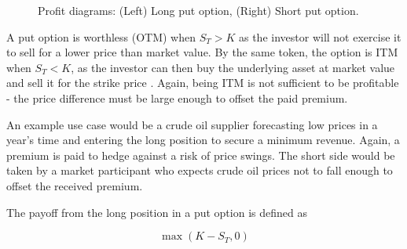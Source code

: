\documentclass[english,12pt,a4paper,pdftex,sci,utf8]{aaltothesis}
\begin{document}
\begin{figure}[H]
{

    
}
\caption{Profit diagrams: (Left) Long put option, (Right) Short put option.}
\label{fig:put_payoff}
\end{figure}

A put option is worthless (OTM) when $S_T > K$ as the investor will not exercise it to sell for a lower price than market value. By the same token, the option is ITM when  $S_T < K$, as the investor can then buy the underlying asset at market value and sell it for the strike price \cite[p. 209]{hull2013fundamentals}. Again, being ITM is not sufficient to be profitable - the price difference must be large enough to offset the paid premium.

An example use case would be a crude oil supplier forecasting low prices in a year's time and entering the long position to secure a minimum revenue. Again, a premium is paid to hedge against a risk of price swings. The short side would be taken by a market participant who expects crude oil prices not to fall enough to offset the received premium.
\bigskip

The payoff from the long position in a put option is defined as

\begin{equation}
    \max(K-S_T,0)
\end{equation}
\end{document}
